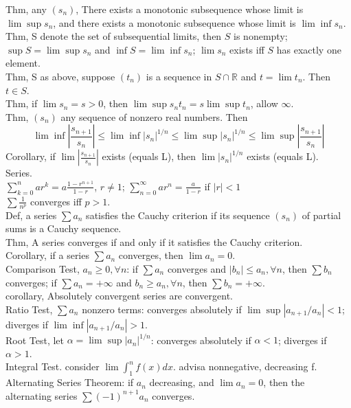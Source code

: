 \documentclass[paper=a4, fontsize=11pt]{scrartcl} %
\numberwithin{equation}{section} %
\numberwithin{figure}{section} %
\numberwithin{table}{section} %
\begin{document}
Thm, any $(s_n)$, There exists a monotonic subsequence whose limit is $\lim\sup s_n$, and there exists a monotonic subsequence whose limit is $\lim\inf s_n$.\\
Thm, S denote the set of subsequential limits, then $S$ is nonempty; $\sup S=\lim\sup s_n$ and $\inf S=\lim\inf s_n$; $\lim s_n$ exists iff $S$ has exactly one element.\\
Thm, S as above, suppose $(t_n)$ is a sequence in $S\cap \mathbb{R}$ and $t=\lim t_n$. Then $t\in S$.\\
Thm, if $\lim s_n=s>0$, then $\lim\sup s_nt_n = s\lim\sup t_n$, allow $\infty$.\\
Thm, $(s_n)$ any sequence of nonzero real numbers. Then
\begin{equation}
\lim\inf|\frac{s_{n+1}}{s_n}| \leq \lim\inf |s_n|^{1/n} \leq \lim\sup |s_n|^{1/n} \leq \lim\sup |\frac{s_{n+1}}{s_n}|
\end{equation}
Corollary, if $\lim |\frac{s_{n+1}}{s_n}|$ exists (equals L), then $\lim|s_n|^{1/n}$ exists (equals L).\\
Series.\\
$\sum_{k=0}^n ar^k = a\frac{1-r^{n+1}}{1-r}$, $r\neq 1$; $\sum_{n=0}^\infty ar^n = \frac{a}{1-r}$ if $|r|<1$\\
$\sum \frac{1}{n^p}$ converges iff $p>1$.\\
Def, a series $\sum a_n$ satisfies the Cauchy criterion if its sequence $(s_n)$ of partial sums is a Cauchy sequence.\\
Thm, A series converges if and only if it satisfies the Cauchy criterion.\\
Corollary, if a series $\sum a_n$ converges, then $\lim a_n = 0$.\\
Comparison Test, $a_n\geq 0, \forall n$: if $\sum a_n$ converges and $|b_n|\leq a_n,\forall n$, then $\sum b_n$ converges; if $\sum a_n = +\infty$ and $b_n\geq a_n, \forall n$, then $\sum b_n=+\infty$.\\
corollary, Absolutely convergent series are convergent.\\
Ratio Test, $\sum a_n$ nonzero terms: converges absolutely if $\lim\sup|a_{n+1}/a_n|<1$; diverges if $\lim\inf|a_{n+1}/a_n|>1$.\\
Root Test, let $\alpha = \lim\sup |a_n|^{1/n}$: converges absolutely if $\alpha<1$; diverges if $\alpha >1$.\\
Integral Test.
consider $\lim \int_1^n f(x)dx$. advisa nonnegative, decreasing f.\\
Alternating Series Theorem: if $a_n$ decreasing, and $\lim a_n=0$, then the alternating series $\sum (-1)^{n+1} a_n$ converges.
\end{document}
